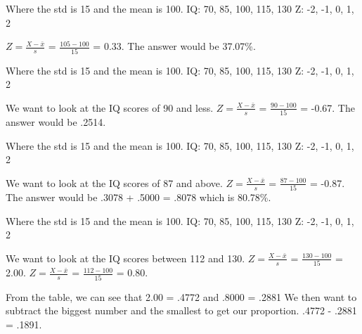 \documentclass[11pt]{report}
\begin{document}
{
Where the std is 15 and the mean is 100. \newline
IQ: 70, 85, 100, 115, 130 \newline
Z: -2, -1, 0, 1, 2 \newline 

$Z = \frac{X - \bar{x}}{s}$ = $\frac{105 - 100}{15}$ = 0.33. \newline
The answer would be 37.07\%.
}


{
Where the std is 15 and the mean is 100. \newline
IQ: 70, 85, 100, 115, 130 \newline 
Z: -2, -1, 0, 1, 2 \newline

We want to look at the IQ scores of 90 and less. 
$Z = \frac{X - \bar{x}}{s}$ = $\frac{90 - 100}{15}$ = -0.67. \newline
The answer would be .2514.
}

{
Where the std is 15 and the mean is 100. \newline
IQ: 70, 85, 100, 115, 130  \newline
Z: -2, -1, 0, 1, 2 \newline

We want to look at the IQ scores of 87 and above.
$Z = \frac{X - \bar{x}}{s}$ = $\frac{87 - 100}{15}$ = -0.87. \newline
The answer would be .3078 + .5000 = .8078 which is 80.78\%.
}

{
Where the std is 15 and the mean is 100. \newline
IQ: 70, 85, 100, 115, 130 \newline
Z: -2, -1, 0, 1, 2 \newline

We want to look at the IQ scores between 112 and 130. \newline
$Z = \frac{X - \bar{x}}{s}$ = $\frac{130 - 100}{15}$ = 2.00. \newline
$Z = \frac{X - \bar{x}}{s}$ = $\frac{112 - 100}{15}$ = 0.80. \newline

From the table, we can see that 2.00 = .4772 and .8000 = .2881 We then want to subtract the biggest number and the smallest to get our proportion. \newline
.4772 - .2881 = .1891.
}
\end{document}
